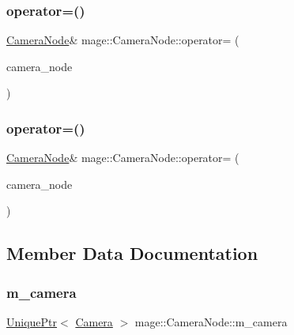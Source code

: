 \hypertarget{classmage_1_1_camera_node_a03442d51e4279717f6692e0a731967a1}{}\label{classmage_1_1_camera_node_a03442d51e4279717f6692e0a731967a1} 
\subsubsection{\texorpdfstring{operator=()}{operator=()}\hspace{0.1cm}{\footnotesize\ttfamily [1/2]}}
{\footnotesize\ttfamily \hyperlink{classmage_1_1_camera_node}{Camera\+Node}\& mage\+::\+Camera\+Node\+::operator= (\begin{DoxyParamCaption}\item[{const \hyperlink{classmage_1_1_camera_node}{Camera\+Node} \&}]{camera\+\_\+node }\end{DoxyParamCaption})\hspace{0.3cm}{\ttfamily [delete]}}

\hypertarget{classmage_1_1_camera_node_a8da019549eeac6c4d7d6d7c4017dd498}{}\label{classmage_1_1_camera_node_a8da019549eeac6c4d7d6d7c4017dd498} 
\subsubsection{\texorpdfstring{operator=()}{operator=()}\hspace{0.1cm}{\footnotesize\ttfamily [2/2]}}
{\footnotesize\ttfamily \hyperlink{classmage_1_1_camera_node}{Camera\+Node}\& mage\+::\+Camera\+Node\+::operator= (\begin{DoxyParamCaption}\item[{\hyperlink{classmage_1_1_camera_node}{Camera\+Node} \&\&}]{camera\+\_\+node }\end{DoxyParamCaption})\hspace{0.3cm}{\ttfamily [delete]}}



\subsection{Member Data Documentation}
\hypertarget{classmage_1_1_camera_node_a18f00f7ccd0c677043e11a1b3085dbfb}{}\label{classmage_1_1_camera_node_a18f00f7ccd0c677043e11a1b3085dbfb} 
\subsubsection{\texorpdfstring{m\+\_\+camera}{m\_camera}}
{\footnotesize\ttfamily \hyperlink{namespacemage_a8c307fbcc33bce9b7f2aa4c26c3b95cf}{Unique\+Ptr}$<$ \hyperlink{classmage_1_1_camera}{Camera} $>$ mage\+::\+Camera\+Node\+::m\+\_\+camera\hspace{0.3cm}{\ttfamily [private]}}

